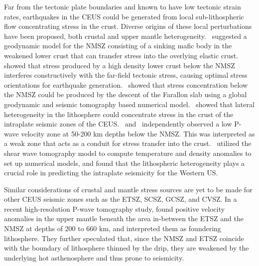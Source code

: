 \documentclass[draft,linenumbers]{agujournal2018}
\begin{document}
    Far from the tectonic plate boundaries and known to have low tectonic strain rates, earthquakes in the CEUS could be generated from local sub-lithospheric flow concentrating stress in the crust. Diverse origins of these local perturbations have been proposed, both crustal and upper mantle heterogeneity.~\citet{pollitz2001sinking} suggested a geodynamic model for the NMSZ consisting of a sinking mafic body in the weakened lower crust that can transfer stress into the overlying elastic crust. \citet{levandowski2016dense} showed that stress produced by a high density lower crust below the NMSZ interferes constructively with the far-field tectonic stress, causing optimal stress orientations for earthquake generation.~\citet{forte2007descent} showed that stress concentration below the NMSZ could be produced by the descent of the Farallon slab using a global geodynamic and seismic tomography based numerical model.~\citet{li2007stress} showed that lateral heterogeneity in the lithosphere could concentrate stress in the crust of the intraplate seismic zones of the CEUS.~\citet{chen2014crust} and~\citet{nyamwandha2016joint} independently observed a low P-wave velocity zone at 50-200 km depths below the NMSZ. This was interpreted as a weak zone that acts as a conduit for stress transfer into the crust.~\citet{becker2015western}  utilized the shear wave tomography model to compute temperature and density anomalies to set up numerical models, and found that the lithospheric heterogeneity plays a crucial role in predicting the intraplate seismicity for the Western US.  
    
Similar considerations of crustal and mantle stress sources are yet to be made for other CEUS seismic zones such as the ETSZ, SCSZ, GCSZ, and CVSZ. In a recent high-resolution P-wave tomography study, \citet{Biryol_2016} found positive velocity anomalies in the upper mantle beneath the area in-between the ETSZ and the NMSZ at depths of 200 to 660 km, and interpreted them as foundering lithosphere. They further speculated that, since the NMSZ and ETSZ coincide with the boundary of lithosphere thinned by the drip, they are weakened by the underlying hot asthenosphere and thus prone to seismicity. 
\end{document}
